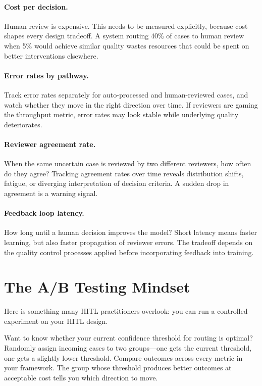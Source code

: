 \paragraph{Cost per decision.} Human review is expensive. This needs to be measured explicitly, because cost shapes every design tradeoff. A system routing 40\% of cases to human review when 5\% would achieve similar quality wastes resources that could be spent on better interventions elsewhere.

\paragraph{Error rates by pathway.} Track error rates separately for auto-processed and human-reviewed cases, and watch whether they move in the right direction over time. If reviewers are gaming the throughput metric, error rates may look stable while underlying quality deteriorates.

\paragraph{Reviewer agreement rate.} When the same uncertain case is reviewed by two different reviewers, how often do they agree? Tracking agreement rates over time reveals distribution shifts, fatigue, or diverging interpretation of decision criteria. A sudden drop in agreement is a warning signal.

\paragraph{Feedback loop latency.} How long until a human decision improves the model? Short latency means faster learning, but also faster propagation of reviewer errors. The tradeoff depends on the quality control processes applied before incorporating feedback into training.

\section{The A/B Testing Mindset}

Here is something many HITL practitioners overlook: you can run a controlled experiment on your HITL design.

Want to know whether your current confidence threshold for routing is optimal? Randomly assign incoming cases to two groups---one gets the current threshold, one gets a slightly lower threshold. Compare outcomes across every metric in your framework. The group whose threshold produces better outcomes at acceptable cost tells you which direction to move.

